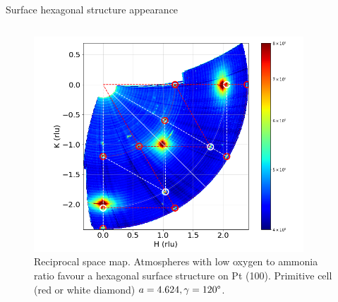 \begin{frame}{Surface hexagonal structure appearance}
\begin{columns}
    \begin{figure}
        \centering

        \includegraphics[width=0.9\textwidth]{Figures/sxrd_data/maps/Map_hkl_surf_or_2227-2283.png}
        \caption{Reciprocal space map. Atmospheres with low oxygen to ammonia ratio favour a hexagonal surface structure on Pt (100). Primitive cell (red or white diamond) $a=4.624, \gamma=120\degree$.}

        \label{fig:CondB}
    \end{figure}
    
    \end{columns}

\end{frame}